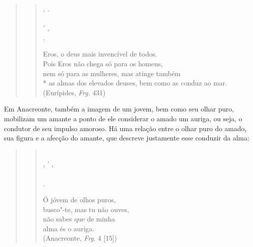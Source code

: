 \begin{quote}
\begin{verse}
,   .\\
     \\
'  ,    \\
    .\\


\bigskip


Eros, o deus mais invencível de todos.\\
Pois Eros não chega só para os homens,\\
nem só para as mulheres, mas atinge também\\*
as almas dos elevados deuses, bem como as conduz ao mar.\\

 

\hfill (Eurípides, \emph{Frg. }431)
\end{verse}
\end{quote}

 

Em Anacreonte, também a imagem de um jovem, bem como seu olhar puro,
mobilizam um amante a ponto de ele considerar o amado um auriga, ou
seja, o condutor de seu impulso amoroso. Há uma relação entre o olhar
puro do amado, sua figura e a afecção do amante, que descreve justamente
esse conduzir da alma:

 

\begin{quote}
\begin{verse}
   \\
 ,  '  ,\\
    \\
 .\\


\bigskip 

Ó jóvem de olhos puros,\\
busco"-te, mas tu não ouves,\\
não sabes que de minha\\
alma és o auriga.\\

 

\hfill (Anacreonte, \emph{Frg}. 4 [15])
\end{verse}
\end{quote}

